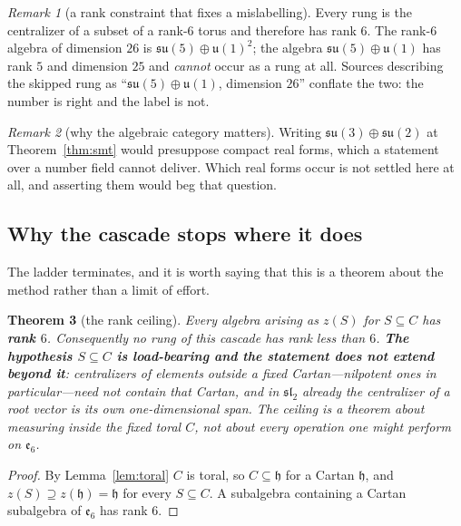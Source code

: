 \documentclass[11pt,reqno]{amsart}
\theoremstyle{plain}
\newtheorem{theorem}{Theorem}[section]
\theoremstyle{definition}
\theoremstyle{remark}
\newtheorem{remark}[theorem]{Remark}
\newcommand{\su}{\mathfrak{su}}
\newcommand{\sll}{\mathfrak{sl}}
\newcommand{\uu}{\mathfrak{u}}
\newcommand{\ee}{\mathfrak{e}}
\newcommand{\h}{\mathfrak{h}}
\begin{document}
\begin{remark}[a rank constraint that fixes a mislabelling]\label{rem:rank}
Every rung is the centralizer of a subset of a rank-$6$ torus and therefore has rank
$6$. The rank-$6$ algebra of dimension $26$ is $\su(5)\oplus\uu(1)^2$; the algebra
$\su(5)\oplus\uu(1)$ has rank $5$ and dimension $25$ and \emph{cannot} occur as a rung
at all. Sources describing the skipped rung as ``$\su(5)\oplus\uu(1)$, dimension $26$''
conflate the two: the number is right and the label is not.
\end{remark}

\begin{remark}[why the algebraic category matters]
Writing $\su(3)\oplus\su(2)$ at Theorem~\ref{thm:smt} would presuppose compact real
forms, which a statement over a number field cannot deliver. Which real forms occur is
not settled here at all, and asserting them would beg that question.
\end{remark}

\subsection{Why the cascade stops where it does}\label{sec:rankceiling}

The ladder terminates, and it is worth saying that this is a theorem about the method
rather than a limit of effort.

\begin{theorem}[the rank ceiling]\label{thm:rankceiling}
Every algebra arising as $z(S)$ for $S\subseteq C$ has \textbf{rank $6$}. Consequently no
rung of \emph{this} cascade has rank less than $6$. \textbf{The hypothesis $S\subseteq C$
is load-bearing and the statement does not extend beyond it}: centralizers of elements
outside a fixed Cartan---nilpotent ones in particular---need not contain that Cartan, and
in $\sll_2$ already the centralizer of a root vector is its own one-dimensional span. The
ceiling is a theorem about measuring inside the fixed toral $C$, not about every operation
one might perform on $\ee_6$.
\end{theorem}

\begin{proof}
By Lemma~\ref{lem:toral} $C$ is toral, so $C\subseteq\h$ for a Cartan $\h$, and
$z(S)\supseteq z(\h)=\h$ for every $S\subseteq C$. A subalgebra containing a Cartan
subalgebra of $\ee_6$ has rank $6$.
\end{proof}
\end{document}
